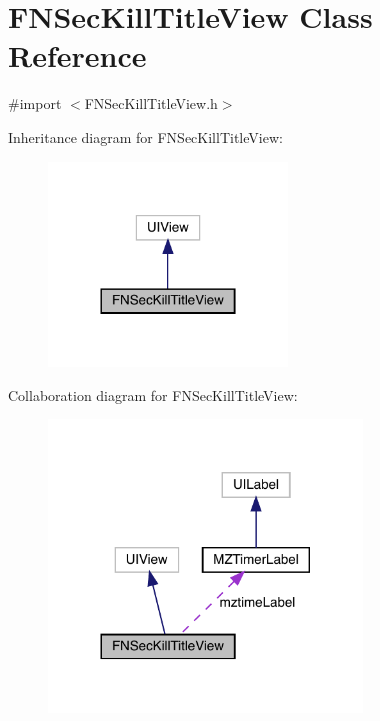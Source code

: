 \hypertarget{interface_f_n_sec_kill_title_view}{}\section{F\+N\+Sec\+Kill\+Title\+View Class Reference}
\label{interface_f_n_sec_kill_title_view}


{\ttfamily \#import $<$F\+N\+Sec\+Kill\+Title\+View.\+h$>$}



Inheritance diagram for F\+N\+Sec\+Kill\+Title\+View\+:\nopagebreak
\begin{figure}[H]
\begin{center}
\leavevmode
\includegraphics[width=180pt]{interface_f_n_sec_kill_title_view__inherit__graph}
\end{center}
\end{figure}


Collaboration diagram for F\+N\+Sec\+Kill\+Title\+View\+:\nopagebreak
\begin{figure}[H]
\begin{center}
\leavevmode
\includegraphics[width=236pt]{interface_f_n_sec_kill_title_view__coll__graph}
\end{center}
\end{figure}
